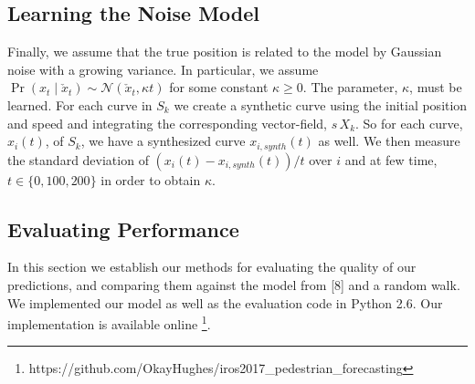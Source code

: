 \documentclass[letterpaper,10pt,conference]{ieeeconf}
\begin{document}
  \subsection{Learning the Noise Model}
  Finally, we assume that the true position is related to the model by Gaussian noise with a growing variance.
  In particular, we assume $\Pr( x_t \mid \check{x}_t) \sim \mathcal{N}( \check{x}_t , \kappa t)$ for some constant $\kappa \geq 0$.
  The parameter, $\kappa$, must be learned.
  For each curve in $S_k$ we create a synthetic curve using the initial position and speed and integrating the corresponding vector-field, $s\, X_k$.
  So for each curve, $x_i(t)$, of $S_k$, we have a synthesized curve $x_{i,synth}(t)$ as well.
  We then measure the standard deviation of $(x_i(t) - x_{i,synth}(t)) / t$ over $i$ and at few time, $t \in \{ 0, 100, 200 \}$ in order to obtain $\kappa$.
  
 \subsection{Evaluating Performance}
In this section we establish our methods for evaluating the quality of our predictions, and comparing them against the model from [8] and a random walk.
We implemented our model as well as the evaluation code in Python 2.6. Our implementation is available online \footnote{https://github.com/OkayHughes/iros2017\_pedestrian\_forecasting}.
\end{document}
